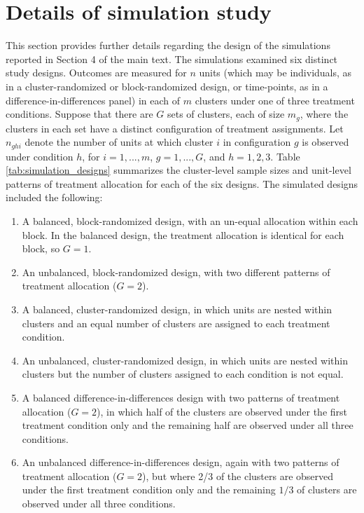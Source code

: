 \documentclass{article}\usepackage[]{graphicx}\usepackage[]{color}
\begin{document}
\newpage
\section{Details of simulation study}
\label{sec:simulations}

This section provides further details regarding the design of the simulations reported in Section 4 of the main text. The simulations examined six distinct study designs. Outcomes are measured for $n$ units (which may be individuals, as in a cluster-randomized or block-randomized design, or time-points, as in a difference-in-differences panel) in each of $m$ clusters under one of three treatment conditions. Suppose that there are $G$ sets of clusters, each of size $m_g$, where the clusters in each set have a distinct configuration of treatment assignments. Let $n_{ghi}$ denote the number of units at which cluster $i$ in configuration $g$ is observed under condition $h$, for $i=1,...,m$, $g = 1,...,G$, and $h = 1,2,3$. Table \ref{tab:simulation_designs} summarizes the cluster-level sample sizes and unit-level patterns of treatment allocation for each of the six designs. The simulated designs included the following:  
\begin{enumerate}
\item A balanced, block-randomized design, with an un-equal allocation within each block. In the balanced design, the treatment allocation is identical for each block, so $G = 1$.
\item An unbalanced, block-randomized design, with two different patterns of treatment allocation ($G = 2$).
\item A balanced, cluster-randomized design, in which units are nested within clusters and an equal number of clusters are assigned to each treatment condition.
\item An unbalanced, cluster-randomized design, in which units are nested within clusters but the number of clusters assigned to each condition is not equal. 
\item A balanced difference-in-differences design with two patterns of treatment allocation ($G = 2$), in which half of the clusters are observed under the first treatment condition only and the remaining half are observed under all three conditions.
\item An unbalanced difference-in-differences design, again with two patterns of treatment allocation ($G = 2$), but where 2/3 of the clusters are observed under the first treatment condition only and the remaining $1 / 3$ of clusters are observed under all three conditions.
\end{enumerate}
\end{document}
